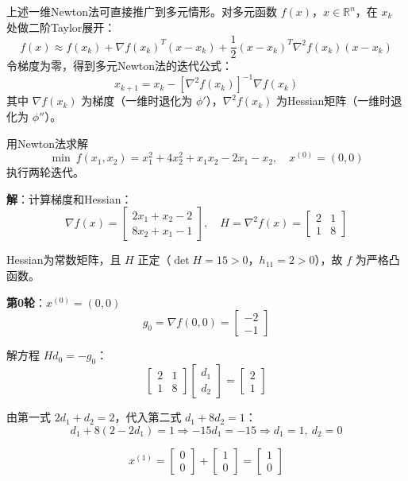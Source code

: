 \begin{notebox}[多元Newton法]
上述一维Newton法可直接推广到多元情形。对多元函数 $f(x)$，$x \in \mathbb{R}^n$，在 $x_k$ 处做二阶Taylor展开：
\[
f(x) \approx f(x_k) + \nabla f(x_k)^T (x - x_k) + \frac{1}{2}(x - x_k)^T \nabla^2 f(x_k) (x - x_k)
\]
令梯度为零，得到多元Newton法的迭代公式：
\[
x_{k+1} = x_k - [\nabla^2 f(x_k)]^{-1} \nabla f(x_k)
\]
其中 $\nabla f(x_k)$ 为梯度（一维时退化为 $\phi'$），$\nabla^2 f(x_k)$ 为Hessian矩阵（一维时退化为 $\phi''$）。
\end{notebox}

\begin{example}[多元Newton法]\label{ex:newton-multidim}
用Newton法求解
\[
\min\ f(x_1, x_2) = x_1^2 + 4x_2^2 + x_1 x_2 - 2x_1 - x_2,\quad x^{(0)} = (0, 0)
\]
执行两轮迭代。

\textbf{解}：计算梯度和Hessian：
\[
\nabla f(x) = \begin{bmatrix} 2x_1 + x_2 - 2 \\ 8x_2 + x_1 - 1 \end{bmatrix},\quad
H = \nabla^2 f(x) = \begin{bmatrix} 2 & 1 \\ 1 & 8 \end{bmatrix}
\]

Hessian为常数矩阵，且 $H$ 正定（$\det H = 15 > 0$，$h_{11} = 2 > 0$），故 $f$ 为严格凸函数。

\textbf{第0轮}：$x^{(0)} = (0, 0)$
\[
g_0 = \nabla f(0, 0) = \begin{bmatrix} -2 \\ -1 \end{bmatrix}
\]

解方程 $H d_0 = -g_0$：
\[
\begin{bmatrix} 2 & 1 \\ 1 & 8 \end{bmatrix} \begin{bmatrix} d_1 \\ d_2 \end{bmatrix} = \begin{bmatrix} 2 \\ 1 \end{bmatrix}
\]

由第一式 $2d_1 + d_2 = 2$，代入第二式 $d_1 + 8d_2 = 1$：
\[
d_1 + 8(2 - 2d_1) = 1 \Rightarrow -15d_1 = -15 \Rightarrow d_1 = 1,\ d_2 = 0
\]

\[
x^{(1)} = \begin{bmatrix} 0 \\ 0 \end{bmatrix} + \begin{bmatrix} 1 \\ 0 \end{bmatrix} = \begin{bmatrix} 1 \\ 0 \end{bmatrix}
\]


\end{example}
